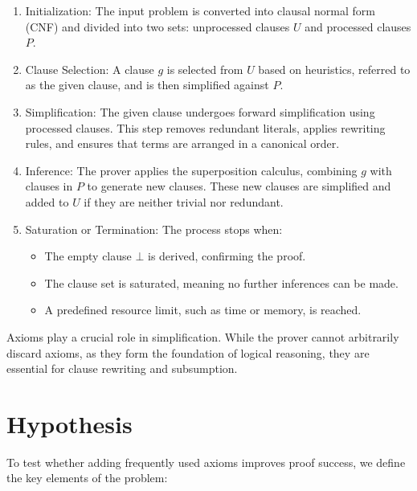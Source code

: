 \documentclass[english,version-2020-11]{uzl-thesis}
\begin{document}
\begin{enumerate}
    \item Initialization: The input problem is converted into clausal normal form (CNF) and divided into two sets: unprocessed clauses \( U \) and processed clauses \( P \).
    \item Clause Selection: A clause \( g \) is selected from \( U \) based on heuristics, referred to as the given clause, and is then simplified against \( P \).
    \item Simplification: The given clause undergoes forward simplification using processed clauses. This step removes redundant literals, applies rewriting rules, and ensures that terms are arranged in a canonical order.
    \item Inference: The prover applies the superposition calculus, combining \( g \) with clauses in \( P \) to generate new clauses. These new clauses are simplified and added to \( U \) if they are neither trivial nor redundant.
    \item Saturation or Termination: The process stops when:
    \begin{itemize}
        \item The empty clause \( \bot \) is derived, confirming the proof.
        \item The clause set is saturated, meaning no further inferences can be made.
        \item A predefined resource limit, such as time or memory, is reached.
    \end{itemize}
\end{enumerate}
\cite{Schulz2019}

Axioms play a crucial role in simplification. While the prover cannot arbitrarily discard axioms, as they form the foundation of logical reasoning, they are essential for clause rewriting and subsumption.


\section{Hypothesis}

To test whether adding frequently used axioms improves proof success, we define the key elements of the problem:
\end{document}
